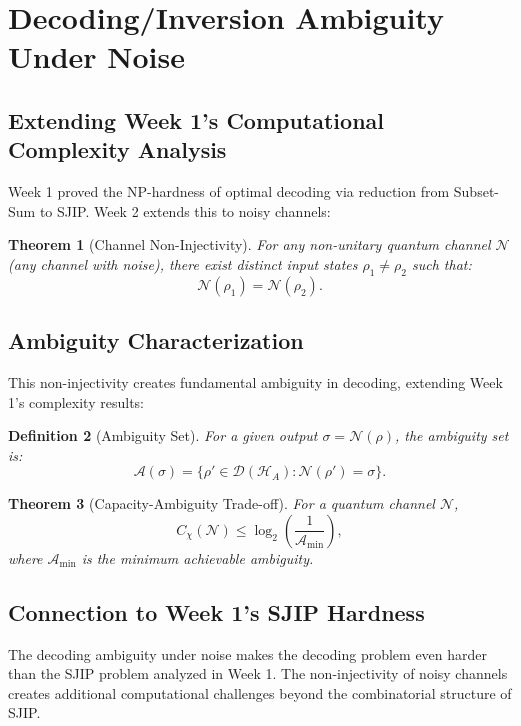 \documentclass[12pt,a4paper]{article}
\newtheorem{theorem}{Theorem}[section]
\newtheorem{definition}[theorem]{Definition}
\begin{document}
\section{Decoding/Inversion Ambiguity Under Noise}
\label{sec:decoding_ambiguity}

\subsection{Extending Week 1's Computational Complexity Analysis}
Week 1 proved the NP-hardness of optimal decoding via reduction from Subset-Sum to SJIP. Week 2 extends this to noisy channels:

\begin{theorem}[Channel Non-Injectivity]
    For any non-unitary quantum channel $\mathcal{N}$ (any channel with noise), there exist distinct input states $\rho_1 \neq \rho_2$ such that:
    \[
    \mathcal{N}(\rho_1) = \mathcal{N}(\rho_2).
    \]
\end{theorem}

\subsection{Ambiguity Characterization}
This non-injectivity creates fundamental ambiguity in decoding, extending Week 1's complexity results:

\begin{definition}[Ambiguity Set]
    For a given output $\sigma = \mathcal{N}(\rho)$, the ambiguity set is:
    \[
    \mathcal{A}(\sigma) = \{ \rho' \in \mathcal{D}(\mathcal{H}_A) : \mathcal{N}(\rho') = \sigma \}.
    \]
\end{definition}

\begin{theorem}[Capacity-Ambiguity Trade-off]
    For a quantum channel $\mathcal{N}$,
    \[
    C_\chi(\mathcal{N}) \leq \log_2\left( \frac{1}{\mathcal{A}_{\min}} \right),
    \]
    where $\mathcal{A}_{\min}$ is the minimum achievable ambiguity.
\end{theorem}

\subsection{Connection to Week 1's SJIP Hardness}
The decoding ambiguity under noise makes the decoding problem even harder than the SJIP problem analyzed in Week 1. The non-injectivity of noisy channels creates additional computational challenges beyond the combinatorial structure of SJIP.
\end{document}
